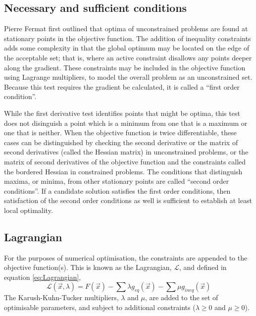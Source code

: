 \subsection{Necessary and sufficient conditions}

Pierre Fermat first outlined that optima of unconstrained problems are found at stationary points in the objective function. The addition of inequality constraints adds some complexity in that the global optimum may be located on the edge of the acceptable set; that is, where an active constraint disallows any points deeper along the gradient. These constraints may be included in the objective function using Lagrange multipliers, to model the overall problem as an unconstrained set. Because this test requires the gradient be calculated, it is called a \enquote{first order condition}.

While the first derivative test identifies points that might be optima, this test does not disinguish a point which is a minimum from one that is a maximum or one that is neither. When the objective function is twice differentiable, these cases can be distinguished by checking the second derivative or the matrix of second derivatives (called the Hessian matrix) in unconstrained problems, or the matrix of second derivatives of the objective function and the constraints called the bordered Hessian in constrained problems. The conditions that distinguish maxima, or minima, from other stationary points are called \enquote{second order conditions}. If a candidate solution satisfies the first order conditions, then satisfaction of the second order conditions as well is sufficient to establish at least local optimality.


\subsection{Lagrangian} \label{sub:Lagrangian}

For the purposes of numerical optimisation, the constraints are appended to the objective function(s). This is known as the Lagrangian, $\mathcal{L}$, and defined in equation \eqref{eq:Lagrangian},
\begin{equation} \label{eq:Lagrangian}
\mathcal{L}(\vec{x},\lambda) = F(\vec{x}) - \sum\lambda g_{eq}(\vec{x}) - \sum\mu g_{ineq}(\vec{x})
\end{equation}
The Karush-Kuhn-Tucker multipliers, $\lambda$ and $\mu$, are added to the set of optimisable parameters, and subject to additional constraints ($\lambda\ge0$ and $\mu\ge0$). %

